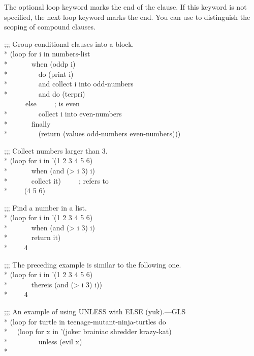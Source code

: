 \begin{defloop}
The optional loop keyword  marks the end of the clause.  If this
keyword is not specified, the next loop keyword marks the end.  You can use
 to distinguish the scoping of compound clauses.
\begin{lisp}
;;; Group conditional clauses into a block. \\*
(loop for i in numbers-list \\*
~~~~~~when (oddp i) \\*
~~~~~~~~do (print i) \\*
~~~~~~~~and collect i into odd-numbers \\*
~~~~~~~~and do (terpri) \\
~~~~~~else~~~~~;\textrm{ is even} \\*
~~~~~~~~collect i into even-numbers \\*
~~~~~~finally \\*
~~~~~~~~(return (values odd-numbers even-numbers)))
\end{lisp}
\begin{lisp}
;;; Collect numbers larger than 3. \\*
(loop for i in '(1 2 3 4 5 6) \\*
~~~~~~when (and (> i 3) i) \\*
~~~~~~collect it)~~~~~;\textrm{ refers to } \\*
~~~\EV~(4 5 6)
\end{lisp}
\begin{lisp}
;;; Find a number in a list. \\*
(loop for i in '(1 2 3 4 5 6) \\*
~~~~~~when (and (> i 3) i) \\*
~~~~~~return it) \\*
~~~\EV~4
\end{lisp}
\begin{lisp}
;;; The preceding example is similar to the following one. \\*
(loop for i in '(1 2 3 4 5 6) \\*
~~~~~~thereis (and (> i 3) i)) \\*
~~~\EV~4
\end{lisp}
\begin{lisp}
;;; An example of using UNLESS with ELSE (yuk).\`\textrm{---GLS} \\*
(loop for turtle in teenage-mutant-ninja-turtles do\\*
~~(loop for x in '(joker brainiac shredder krazy-kat) \\*
~~~~~~~~unless (evil x) \\*

\end{lisp}
\end{defloop}
